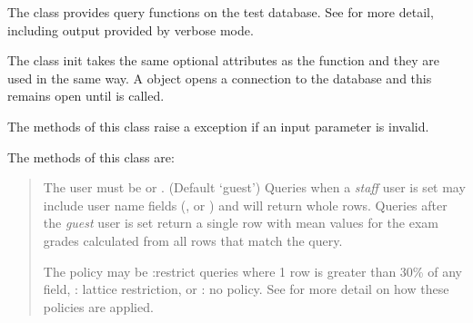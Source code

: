 \documentclass[a4paper,11pt,english]{sphinxmanual}
\begin{document}
\begin{fulllineitems}
\label{reference:dbinfer.DbInfer}
The {\hyperref[reference:dbinfer.DbInfer]{}} class provides query functions on the test database.
See {\hyperref[algorithms:ref\string-algorithms]{}} for more detail, including output provided by verbose mode.

The class init takes the same optional attributes as the  function and they
are used in the same way. A {\hyperref[reference:dbinfer.DbInfer]{}} object opens a connection to the database
and this remains open until  is called.

The methods of this class raise a  exception if an input parameter is invalid.

The methods of this class are:
\begin{quote}

\begin{fulllineitems}
\label{reference:dbinfer.DbInfer.setUser}
\end{fulllineitems}


The user must be  or .  (Default `guest') Queries when a \emph{staff}
user is set may include user name fields (, or ) and will return whole rows. Queries
after the \emph{guest} user is set return a single row with mean values for the exam grades
calculated from all rows that match the query.

\begin{fulllineitems}
\label{reference:dbinfer.DbInfer.setPolicy}
\end{fulllineitems}


The policy may be :restrict queries where 1 row is greater than 30\% of any field,
: lattice restriction, or : no policy. See {\hyperref[algorithms:ref\string-algorithms]{}} for more detail
on how these policies are applied.

\begin{fulllineitems}
\label{reference:dbinfer.DbInfer.setVerbose}
\end{fulllineitems}



\end{quote}
\end{fulllineitems}
\end{document}
